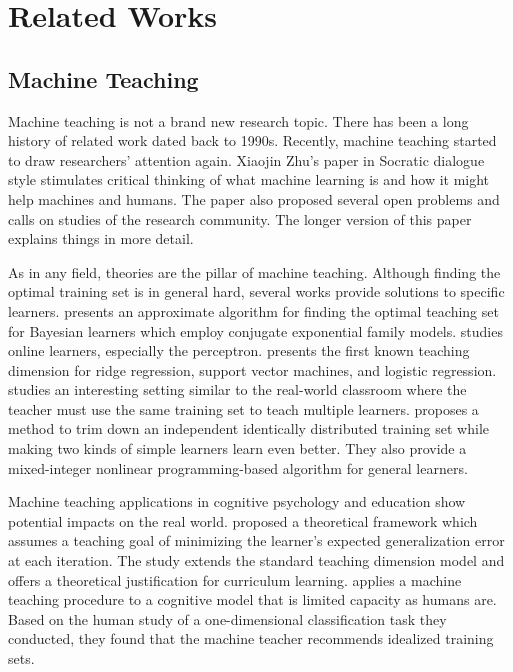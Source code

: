 
\chapter{Related Works}
\label{chap:related}

\section{Machine Teaching}

    Machine teaching is not a brand new research topic.
    There has been a long history of related work dated back to 1990s.
    Recently, machine teaching started to draw researchers' attention again.
    Xiaojin Zhu's paper in Socratic dialogue style \cite{Zhu2015} stimulates critical thinking of
    what machine learning is and how it might help machines and humans.
    The paper also proposed several open problems and calls on studies of the research community.
    The longer version \cite{Zhu2018} of this paper explains things in more detail.

    As in any field, theories are the pillar of machine teaching.
    Although finding the optimal training set is in general hard,
    several works provide solutions to specific learners.
    \textcite{zhu2013machine} presents an approximate algorithm for finding the optimal teaching set
    for Bayesian learners which employ conjugate exponential family models.
    \textcite{xuezhou_zhang_optimal_2016} studies online learners, especially the perceptron.
    \textcite{liu2016teaching} presents the first known teaching dimension for ridge regression,
    support vector machines, and logistic regression.
    \textcite{zhu2017no} studies an interesting setting similar to the real-world classroom
    where the teacher must use the same training set to teach multiple learners.
    \textcite{ma2018teacher} proposes a method to trim down an independent identically distributed training set
    while making two kinds of simple learners learn even better.
    They also provide a mixed-integer nonlinear programming-based algorithm for general learners.

    Machine teaching applications in cognitive psychology and education show potential impacts on the real world.
    \textcite{khan2011humans} proposed a theoretical framework which assumes a teaching goal of
    minimizing the learner's expected generalization error at each iteration.
    The study extends the standard teaching dimension model and
    offers a theoretical justification for curriculum learning.
    \textcite{Patil2014} applies a machine teaching procedure
    to a cognitive model that is limited capacity as humans are.
    Based on the human study of a one-dimensional classification task they conducted,
    they found that the machine teacher recommends idealized training sets.

